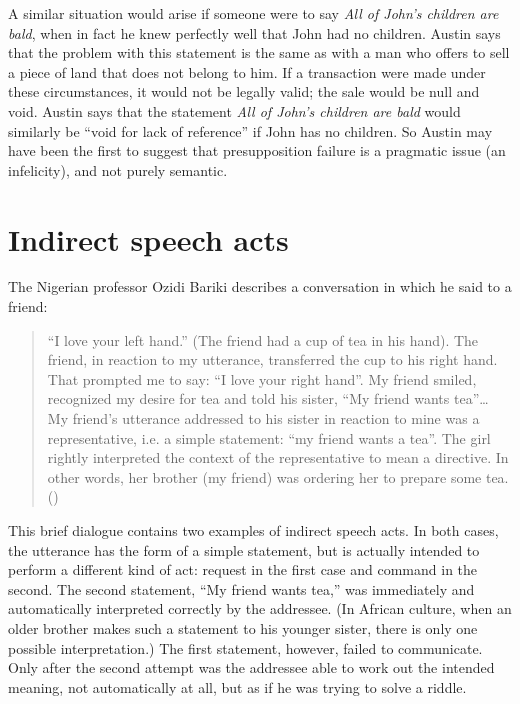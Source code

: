A similar situation would arise if someone were to say \textit{All of John’s children are bald}, when in fact he knew perfectly well that John had no children. Austin says that the problem with this statement is the same as with a man who offers to sell a piece of land that does not belong to him. If a transaction were made under these circumstances, it would not be legally valid; the sale would be null and void. Austin says that the statement \textit{All of John’s children are bald} would similarly be “void for lack of reference” if John has no children. So Austin may have been the first to suggest that presupposition failure is a pragmatic issue (an infelicity), and not purely semantic.


\section{Indirect speech acts}\label{sec:} %

The Nigerian professor Ozidi Bariki describes a conversation in which he said to a friend:


\begin{quote}
“I love your left hand.” (The friend had a cup of tea in his hand). The friend, in reaction to my utterance, transferred the cup to his right hand. That prompted me to say: “I love your right hand”. My friend smiled, recognized my desire for tea and told his sister, “My friend wants tea”… My friend’s utterance addressed to his sister in reaction to mine was a representative, i.e. a simple statement: “my friend wants a tea”. The girl rightly interpreted the context of the representative to mean a directive. In other words, her brother (my friend) was ordering her to prepare some tea.  (\citealt{Bariki2008})
\end{quote}


This brief dialogue contains two examples of indirect speech acts. In both cases, the utterance has the form of a simple statement, but is actually intended to perform a different kind of act: request in the first case and command in the second. The second statement, “My friend wants tea,” was immediately and automatically interpreted correctly by the addressee. (In African culture, when an older brother makes such a statement to his younger sister, there is only one possible interpretation.) The first statement, however, failed to communicate. Only after the second attempt was the addressee able to work out the intended meaning, not automatically at all, but as if he was trying to solve a riddle.



